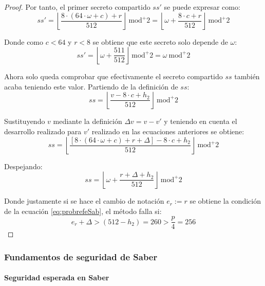 \begin{proof}
	Por tanto, el primer secreto compartido \(ss'\) se puede expresar como:
	\begin{equation}
		ss'=\left\lfloor \dfrac{8\cdot (64\cdot \omega+c)+r}{512} \right\rfloor \ \text{mod}^{+}{2}=\left\lfloor \omega +\dfrac{8\cdot c+r}{512} \right\rfloor \ \text{mod}^{+}{2}
	\end{equation}
	
	Donde como \(c < 64\) y \(r < 8\) se obtiene que este secreto solo depende de $\omega$:
	\begin{equation}
		ss'=\left\lfloor \omega +\dfrac{511}{512} \right\rfloor \ \text{mod}^{+}{2}= \omega \ \text{mod}^{+}{2}
	\end{equation}
	
	Ahora solo queda comprobar que efectivamente el secreto compartido \(ss\) también acaba teniendo este valor. Partiendo de la definición de \(ss\):
	\begin{equation}
		ss=\left\lfloor \dfrac{v-8\cdot c+ h_2}{512}\right\rfloor \ \text{mod}^{+}{2}
	\end{equation}
	
	Sustituyendo \(v\) mediante la definición $\Delta v= v - v'$ y teniendo en cuenta el desarrollo realizado para \(v'\) realizado en las ecuaciones anteriores se obtiene:
	\begin{equation}
		ss=\left\lfloor \dfrac{[8\cdot(64\cdot \omega+c)+r+\Delta]-8\cdot c+ h_2}{512}\right\rfloor \ \text{mod}^{+}{2}
	\end{equation}
	
	Despejando:
	\begin{equation}
		ss=\left\lfloor \omega +\dfrac{r+\Delta+ h_2}{512}\right\rfloor \ \text{mod}^{+}{2}
	\end{equation}
	
	Donde justamente si se hace el cambio de notación \(e_r:=r\) se obtiene la condición de la ecuación \ref{eq:probrefeSab}, el método falla si:
	\begin{equation}
		e_r+\Delta > (512-h_2)= 260 >\dfrac{p}{4}=256
	\end{equation}
\end{proof}
\subsubsection{Fundamentos de seguridad de Saber}
\paragraph{Seguridad esperada en Saber}
\mbox{}\\
